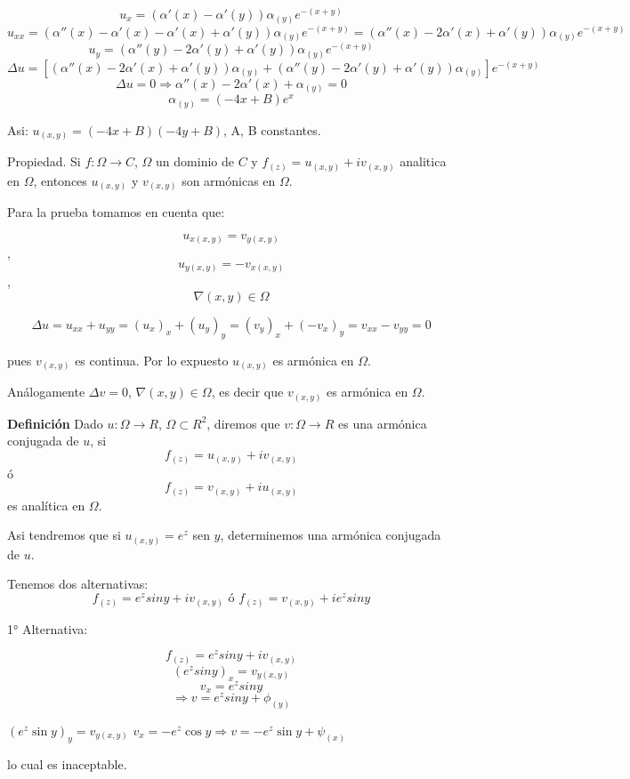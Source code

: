 \documentclass[a4paper,12pt]{article}
\begin{document}
\begin{enumerate}
$$u_{x} = (\alpha'(x) - \alpha'(y)) \alpha_{(y)} e^{-(x+y)}$$
$$u_{xx} = (\alpha''(x) - \alpha'(x) - \alpha'(x) + \alpha'(y)) \alpha_{(y)} e^{-(x+y)} = (\alpha''(x) - 2 \alpha'(x) + \alpha'(y)) \alpha_{(y)} e^{-(x+y)}$$
$$u_{y} = (\alpha''(y) - 2 \alpha'(y) + \alpha'(y)) \alpha_{(y)} e^{-(x+y)}$$
$$\Delta u = [(\alpha''(x) - 2 \alpha'(x) + \alpha'(y)) \alpha_{(y)} + (\alpha''(y) - 2 \alpha'(y) + \alpha'(y)) \alpha_{(y)}] e^{-(x+y)}$$
$$\Delta u = 0 \Rightarrow \alpha''(x) - 2 \alpha'(x) + \alpha_{(y)} = 0$$
$$\alpha_{(y)} = (-4x + B) e^x$$

Asi: $u_{(x,y)} = (-4x + B)(-4y + B)$, A, B constantes.
\end{enumerate}


Propiedad.
Si $f : \Omega \rightarrow C$, $\Omega$ un dominio de $C$ y $f_{(z)} = u_{(x,y)} + iv_{(x,y)}$ analitica en $\Omega$, entonces $u_{(x,y)}$ y $v_{(x,y)}$ son armónicas en $\Omega$.

Para la prueba tomamos en cuenta que:

$$u_{x(x,y)} = v_{y(x,y)}$$, $$u_{y(x,y)} = -v_{x(x,y)}$$, $$\nabla(x,y) \in \Omega$$

$$\Delta u = u_{xx} + u_{yy} = (u_{x})_{x} + (u_{y})_{y} = (v_{y})_{x} + (-v_{x})_{y} = v_{xx} - v_{yy} = 0$$

pues $v_{(x,y)}$ es continua. Por lo expuesto $u_{(x,y)}$ es armónica en $\Omega$.

Análogamente $\Delta v = 0$, $\nabla(x,y) \in \Omega$, es decir que $v_{(x,y)}$ es armónica en $\Omega$.

\textbf{Definición} Dado $u : \Omega \rightarrow R$, $\Omega \subset R^2$, diremos que $v : \Omega \rightarrow R$ es una armónica conjugada de $u$, si $$f_{(z)} = u_{(x,y)} + iv_{(x,y)}$$ ó $$f_{(z)} = v_{(x,y)} + iu_{(x,y)}$$ es analítica en $\Omega$.

Asi tendremos que si $u_{(x,y)} = e^z$ sen $y$, determinemos una armónica conjugada de $u$.

Tenemos dos alternativas: $$f_{(z)} = e^z sin y + iv_{(x,y)} \text{ ó }f_{(z)} = v_{(x,y)} + ie^z sin y$$

1° Alternativa:

$$f_{(z)} = e^z sin y + iv_{(x,y)}$$
$$(e^z sin y)_{x} = v_{y(x,y)}$$ $$v_{x} = e^z sin y$$ $$\Rightarrow v = e^z sin y + \phi_{(y)}$$


$(e^z \sin y)_y = v_{y(x,y)}$ $v_x = -e^z \cos y \Rightarrow v = -e^z \sin y + \psi_{(x)}$

lo cual es inaceptable.
\end{document}
